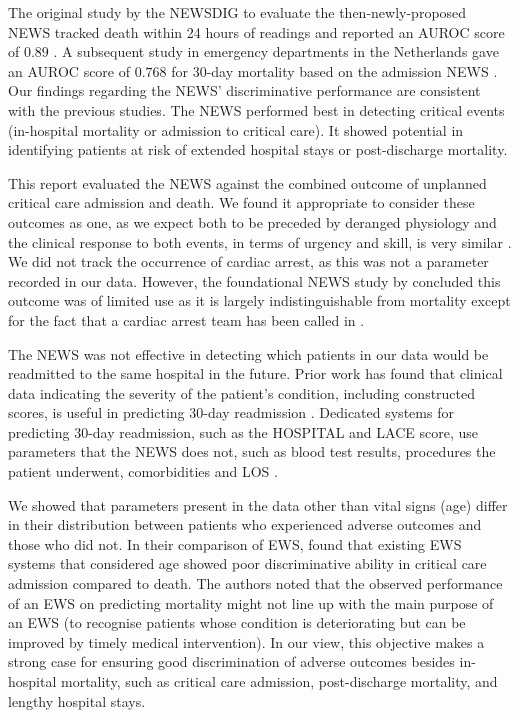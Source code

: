 \documentclass[10pt,journal, compsoc]{IEEEtran}
\begin{document}
The original study by the NEWSDIG to evaluate the then-newly-proposed NEWS tracked death within 24 hours of readings and reported an AUROC score of $0.89$ \cite{Smith13}. A subsequent study in emergency departments in the Netherlands gave an AUROC score of $0.768$ for 30-day mortality based on the admission NEWS \cite{Alam15}. Our findings regarding the NEWS' discriminative performance are consistent with the previous studies. The NEWS performed best in detecting critical events (in-hospital mortality or admission to critical care). It showed potential in identifying patients at risk of extended hospital stays or post-discharge mortality.

This report evaluated the NEWS against the combined outcome of unplanned critical care admission and death. We found it appropriate to consider these outcomes as one, as we expect both to be preceded by deranged physiology and the clinical response to both events, in terms of urgency and skill, is very similar \cite[pp.~4]{Smith13}. We did not track the occurrence of cardiac arrest, as this was not a parameter recorded in our data. However, the foundational NEWS study by \cite{Smith13} concluded this outcome was of limited use as it is largely indistinguishable from mortality except for the fact that a cardiac arrest team has been called in \cite[pp.~4]{Smith13}.

The NEWS was not effective in detecting which patients in our data would be readmitted to the same hospital in the future. Prior work has found that clinical data indicating the severity of the patient's condition, including constructed scores, is useful in predicting 30-day readmission \cite[pp.~5]{Mahmoudim20}. Dedicated systems for predicting 30-day readmission, such as the HOSPITAL and LACE score, use parameters that the NEWS does not, such as blood test results, procedures the patient underwent, comorbidities and LOS \cite{Donze13}.

We showed that parameters present in the data other than vital signs (age) differ in their distribution between patients who experienced adverse outcomes and those who did not. In their comparison of EWS, \cite{Smith13} found that existing EWS systems that considered age showed poor discriminative ability in critical care admission compared to death. The authors noted that the observed performance of an EWS on predicting mortality might not line up with the main purpose of an EWS (to recognise patients whose condition is deteriorating but can be improved by timely medical intervention). In our view, this objective makes a strong case for ensuring good discrimination of adverse outcomes besides in-hospital mortality, such as critical care admission, post-discharge mortality, and lengthy hospital stays.
\end{document}
